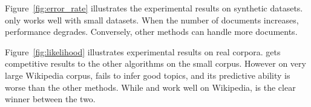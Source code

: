 Figure~\ref{fig:error_rate} illustrates the experimental results on
synthetic datasets.  only works well with small
datasets. When the number of documents increases, 
performance degrades. Conversely, other methods can handle more documents.



Figure~\ref{fig:likelihood} illustrates experimental results on real
corpora.  gets competitive results to the other
algorithms on the small  corpus. However on very large
Wikipedia corpus,  fails to infer good topics, and its
predictive ability is worse than the other methods. While
 and  work well on Wikipedia,  is
the clear winner between the two.


